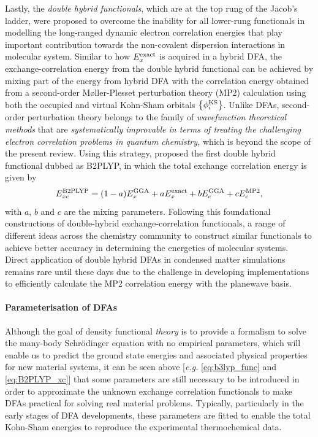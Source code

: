 Lastly, the \emph{double hybrid  functionals}, which are at the top rung of the Jacob's ladder, were proposed to overcome the inability for all lower-rung functionals in modelling the long-ranged dynamic electron correlation energies that play important contribution towards the non-covalent dispersion interactions in molecular system. Similar to how $E_{x}^{\mbox{\scriptsize{exact}}}$  is acquired in a hybrid DFA, the exchange-correlation energy from the double hybrid functional can be achieved by mixing part of the energy from hybrid DFA with the correlation energy obtained from a  second-order M\o ller-Plesset perturbation theory (MP2)\cite{moller1934note} calculation using both the occupied and virtual Kohn-Sham orbitals  $\left\{ \phi_{i}^{\mbox{\scriptsize{KS}}}\right\}$. Unlike DFAs, second-order perturbation theory belongs to the family of \emph{wavefunction theoretical methods} that are \emph{systematically improvable in terms of treating the challenging electron correlation problems in quantum chemistry,} which is beyond the scope of the present review. Using this strategy, \citet{grimme2006semiempirical} proposed the first double hybrid  functional dubbed as B2PLYP, in which the total exchange correlation energy is given by 
\begin{equation}\label{eq:B2PLYP_xc}
E_{xc}^{\mbox{\scriptsize{B2PLYP}}}=(1-a)E_{x}^{\mbox{\scriptsize{GGA}}}+a E_{x}^{\mbox{\scriptsize{exact}}}+bE_{c}^{\mbox{\scriptsize{GGA}}}+cE_{c}^{\mbox{\scriptsize{MP2}}},
\end{equation}
with $a$, $b$ and $c$ are the mixing parameters. Following this foundational constructions of double-hybrid exchange-correlation functionals, a range of different ideas across the chemistry community to construct similar functionals\cite{goerigk2014double} to achieve better accuracy in determining the energetics of molecular systems. Direct application of double hybrid DFAs in condensed matter simulations remains rare until these days due to the challenge in developing implementations to efficiently calculate the MP2 correlation energy with the planewave basis. \cite{carter2008challenges,pisani2008periodic}

\paragraph{\textbf{Parameterisation of DFAs}}
Although the goal of density functional \emph{theory} is to provide a formalism to solve the many-body Schr\"{o}dinger equation with no empirical parameters, which will enable us to predict the ground state energies and associated physical properties for new material systems, it can be seen above [\emph{e.g.} \cref{eq:b3lyp_func} and \cref{eq:B2PLYP_xc}] that some parameters are still necessary to be introduced in order to approximate the unknown exchange correlation functionals to make DFAs practical for solving real material problems. Typically, particularly in the early stages of DFA developments, these parameters are fitted to enable the total Kohn-Sham energies to reproduce the experimental thermochemical data. 


